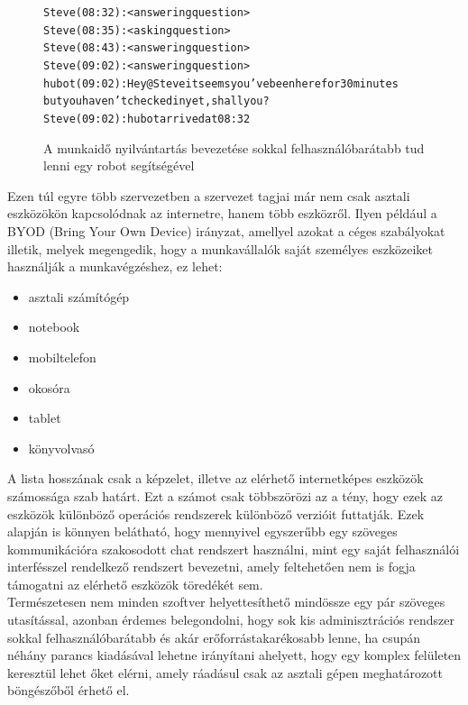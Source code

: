 \begin{figure}[H]
  \begin{alltt}
Steve (08:32): <answering question>
Steve (08:35): <asking question>
Steve (08:43): <answering question>
Steve (09:02): <answering question>
hubot (09:02): Hey @Steve it seems you've been here for 30 minutes
               but you haven't checked in yet, shall you?
Steve (09:02): hubot arrived at 08:32
    \end{alltt}
    \caption[DUMMY]%
    {A munkaidő nyilvántartás bevezetése sokkal felhasználóbarátabb tud lenni egy robot segítségével}%
    \label{lst:workhour_with_hubot_ux}
\end{figure}

Ezen túl egyre több szervezetben a szervezet tagjai már nem csak asztali eszközökön kapcsolódnak az internetre, hanem több eszközről. Ilyen például a BYOD (Bring Your Own Device) irányzat, amellyel azokat a céges szabályokat illetik, melyek megengedik, hogy a munkavállalók saját személyes eszközeiket használják a munkavégzéshez, ez lehet:

\begin{itemize}
  \item asztali számítógép
  \item notebook
  \item mobiltelefon
  \item okosóra
  \item tablet
  \item könyvolvasó
\end{itemize}

A lista hosszának csak a képzelet, illetve az elérhető internetképes eszközök számossága szab határt. Ezt a számot csak többszörözi az a tény, hogy ezek az eszközök különböző operációs rendszerek különböző verzióit futtatják. Ezek alapján is könnyen belátható, hogy mennyivel egyszerűbb egy szöveges kommunikációra szakosodott chat rendszert használni, mint egy saját felhasználói interfésszel rendelkező rendszert bevezetni, amely feltehetően nem is fogja támogatni az elérhető eszközök töredékét sem.\\
\newline
Természetesen nem minden szoftver helyettesíthető mindössze egy pár szöveges utasítással, azonban érdemes belegondolni, hogy sok kis adminisztrációs rendszer sokkal felhasználóbarátabb és akár erőforrástakarékosabb lenne, ha csupán néhány parancs kiadásával lehetne irányítani ahelyett, hogy egy komplex felületen keresztül lehet őket elérni, amely ráadásul csak az asztali gépen meghatározott böngészőből érhető el.

